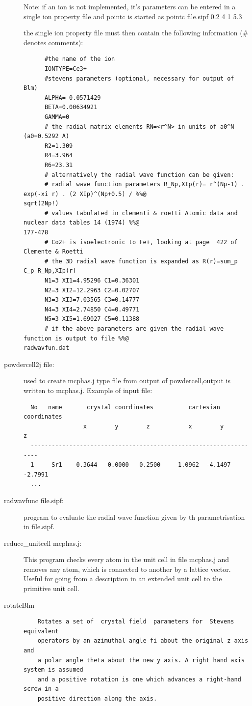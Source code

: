 \begin{description}
                Note: if an ion is not implemented, it's parameters can be 
                      entered in a single ion property file and pointc is
                      started as 
                        pointc file.sipf 0.2 4 1 5.3

                      the single ion property file must then contain the following
                      information (\# denotes comments):
\begin{verbatim}
      #the name of the ion
      IONTYPE=Ce3+
      #stevens parameters (optional, necessary for output of Blm)
      ALPHA=-0.0571429
      BETA=0.00634921
      GAMMA=0
      # the radial matrix elements RN=<r^N> in units of a0^N (a0=0.5292 A)
      R2=1.309
      R4=3.964
      R6=23.31
      # alternatively the radial wave function can be given:
      # radial wave function parameters R_Np,XIp(r)= r^(Np-1) . exp(-xi r) . (2 XIp)^(Np+0.5) / %%@
sqrt(2Np!)  
      # values tabulated in clementi & roetti Atomic data and nuclear data tables 14 (1974) %%@
177-478
      # Co2+ is isoelectronic to Fe+, looking at page  422 of Clemente & Roetti 
      # the 3D radial wave function is expanded as R(r)=sum_p C_p R_Np,XIp(r)
      N1=3 XI1=4.95296 C1=0.36301 
      N2=3 XI2=12.2963 C2=0.02707 
      N3=3 XI3=7.03565 C3=0.14777
      N4=3 XI4=2.74850 C4=0.49771 
      N5=3 XI5=1.69027 C5=0.11388
      # if the above parameters are given the radial wave function is output to file %%@
radwavfun.dat                 
\end{verbatim}                      
\item [\prg powdercell2j\index{powdercell2j} file:]     used to create mcphas.j type file from %
output of powdercell,output is written to mcphas.j.  Example of input file:
\begin{verbatim}
  No   name       crystal coordinates          cartesian coordinates
                 x        y        z           x        y        z
  ------------------------------------------------------------------
  1     Sr1    0.3644   0.0000   0.2500     1.0962  -4.1497  -2.7991
  ...
  \end{verbatim}
\item[\prg radwavfunc\index{radwavfunc} file.sipf:] program to evaluate the radial wave function
given by th parametrisation in file.sipf.
\item[\prg reduce\_unitcell\index{reduce\_unitcell} mcphas.j:] 
                This program checks every atom in the unit cell in file mcphas.j and removes
                any atom, which is connected to another by a lattice vector. Useful for
                going from a description in an extended unit cell to the primitive unit cell.
\item [\prg rotateBlm\index{rotateBlm}]
  \begin{verbatim}
    Rotates a set of  crystal field  parameters for  Stevens equivalent
    operators by an azimuthal angle fi about the original z axis and
    a polar angle theta about the new y axis. A right hand axis system is assumed
    and a positive rotation is one which advances a right-hand screw in a
    positive direction along the axis.


\end{verbatim}
\end{description}
